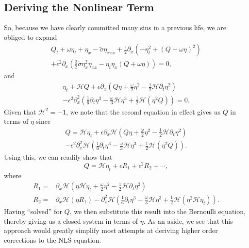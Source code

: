 \documentclass[a4paper,11pt]{article}
\newcommand{\p}{\partial}
\begin{document}
\subsection*{Deriving the Nonlinear Term}
So, because we have clearly committed many sins in a previous life, we are obliged to expand 
\begin{align*}
Q_{t} + \omega \eta_{t} + \eta_{x} - \tilde{\sigma}\eta_{xxx} + \frac{\epsilon}{2}\p_{x}\left(-\eta_{t}^{2} + (Q+\omega \eta)^{2} \right) \\
+ \epsilon^{2}\p_{x}\left( \frac{3}{2}\tilde{\sigma}\eta_{x}^{2}\eta_{xx} - \eta_{t}\eta_{x} \left(Q  + \omega \eta \right) \right) = 0, 
\end{align*}
and
\begin{multline*}
\eta_{t} + \mathcal{H}Q + \epsilon\p_{x}\left(Q\eta + \frac{\omega}{2}\eta^{2}-\frac{1}{2}\mathcal{H}\p_{t}\eta^{2} \right)\\ 
- \epsilon^{2}\p_{x}^{2}\left(\frac{1}{6}\p_{t}\eta^{3} - \frac{\omega}{3}\mathcal{H}\eta^{3} + \frac{1}{2}\mathcal{H}\left(\eta^{2} Q\right)  \right) = 0.
\end{multline*}
Given that $\mathcal{H}^{2}=-1$, we note that the second equation in effect gives us $Q$ in terms of $\eta$ since 
\begin{multline*}
Q = \mathcal{H}\eta_{t} + \epsilon\p_{x}\mathcal{H}\left(Q\eta + \frac{\omega}{2}\eta^{2}-\frac{1}{2}\mathcal{H}\p_{t}\eta^{2} \right)\\ 
- \epsilon^{2}\p_{x}^{2}\mathcal{H}\left(\frac{1}{6}\p_{t}\eta^{3} - \frac{\omega}{3}\mathcal{H}\eta^{3} + \frac{1}{2}\mathcal{H}\left(\eta^{2} Q\right)  \right).
\end{multline*}
Using this, we can readily show that 
\[
Q = \mathcal{H}\eta_{t} + \epsilon R_{1} + \epsilon^{2}R_{2} + \cdots,
\]
where
\begin{align*}
R_{1} = & \p_{x}\mathcal{H}\left(\eta\mathcal{H}\eta_{t} + \frac{\omega}{2}\eta^{2}-\frac{1}{2}\mathcal{H}\p_{t}\eta^{2} \right)\\
R_{2} = & \p_{x}\mathcal{H}\left(\eta R_{1} \right) - \p_{x}^{2}\mathcal{H}\left(\frac{1}{6}\p_{t}\eta^{3} - \frac{\omega}{3}\mathcal{H}\eta^{3} + \frac{1}{2}\mathcal{H}\left(\eta^{2} \mathcal{H}\eta_{t}\right)\right).
\end{align*}
Having ``solved'' for $Q$, we then substitute this result into the Bernoulli equation, thereby giving us a closed system in terms of $\eta$.  As an aside, we see that this approach would greatly simplify most attempts at deriving higher order corrections to the NLS equation.  
\end{document}
